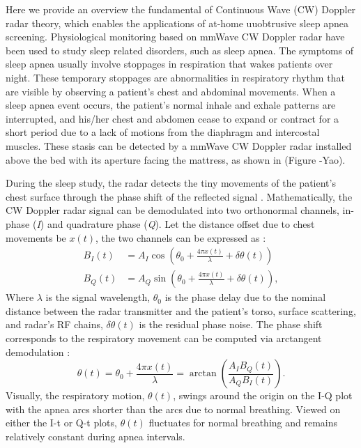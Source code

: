 Here we provide an overview the fundamental of Continuous Wave (CW) Doppler radar theory, which enables the applications of at-home uuobtrusive sleep apnea screening. Physiological monitoring based on mmWave CW Doppler radar have been used to study sleep related disorders, such as sleep apnea. The symptoms of sleep apnea usually involve stoppages in respiration that wakes patients over night. These temporary stoppages are abnormalities in respiratory rhythm that are visible by observing a patient's chest and abdominal movements. When a sleep apnea event occurs, the patient's normal inhale and exhale patterns are interrupted, and his/her chest and abdomen cease to expand or contract for a short period due to a lack of motions from the diaphragm and intercostal muscles. These stasis can be detected by a mmWave CW Doppler radar installed above the bed with its aperture facing the mattress, as shown in (Figure -Yao).

During the sleep study, the radar detects the tiny movements of the patient's chest surface through the phase shift of the reflected signal \cite{droitcour_microwave_2001,lin_microwave_1992,chen_x-band_1986,lin_noninvasive_1975,greneker_radar_1997,droitcour_non-contact_2009,singh_data-based_2013}. Mathematically, the CW Doppler radar signal can be demodulated into two orthonormal channels, in-phase (\textit{I}) and quadrature phase (\textit{Q}). Let the distance offset due to chest movements be $x(t)$, the two channels can be expressed as \cite{park_arctangent_2007}:
\begin{align*}
  {B}_I(t) &= A_I\cos\left(\theta_0+\frac{4\pi x(t)}{\lambda}+\delta\theta(t)\right)\\
  {B}_Q(t) &= A_Q\sin\left(\theta_0+\frac{4\pi x(t)}{\lambda}+\delta\theta(t)\right),
\end{align*}
Where $\lambda$ is the signal wavelength, $\theta_0$ is the phase delay due to the nominal distance between the radar transmitter and the patient's torso, surface scattering, and radar's RF chains, $\delta\theta(t)$ is the residual phase noise. The phase shift corresponds to the respiratory movement can be computed via arctangent demodulation \cite{park_arctangent_2007}:
\begin{equation*}
  \theta(t) = \theta_0 + \frac{4\pi x(t)}{\lambda} = \arctan \left(\frac{A_I{B}_Q(t)}{A_Q{B}_I(t)}\right).
\end{equation*}
Visually, the respiratory motion, $\theta(t)$, swings around the origin on the I-Q plot with the apnea arcs shorter than the arcs due to normal breathing. Viewed on either the I-t or Q-t plots,  $\theta(t)$ fluctuates for normal breathing and remains relatively constant during apnea intervals.

